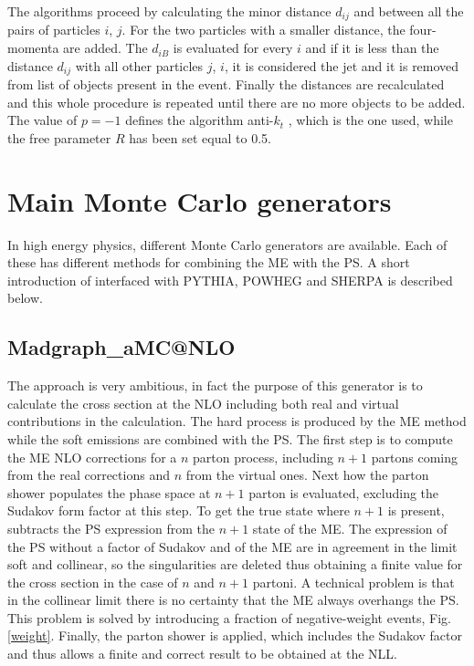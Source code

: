 The algorithms proceed by calculating the minor distance $ d_{ij} $ and between all the pairs of particles $ i $, $ j $. For the two particles with a smaller distance, the four-momenta are added. The $ d_{iB} $ is evaluated for every $ i $ and if it is less than the distance $ d_{ij} $ with all other particles $ j $, $ i $,  it is considered the jet and it is removed from list of objects present in the event.
Finally the distances are recalculated and this whole procedure is repeated until there are no more objects to be added.
The value of $ p = -1 $ defines the algorithm anti-$k_t $ \cite{Cacciari: 2008gp}, which is the one used, while the free parameter $ R $ has been set equal to 0.5.




\section{Main Monte Carlo generators }
In high energy physics, different Monte Carlo generators are available. Each of these has different methods for combining the ME with the PS.
A short introduction of  \aMC interfaced with P{\footnotesize YTHIA}, P{\footnotesize OWHEG}  and S{\footnotesize HERPA} is described below. 
 
 
\subsection*{Madgraph\_aM{\footnotesize C@NLO}}
The \aMC \cite{bib:madgraph} approach is very ambitious, in fact the purpose of this generator is to calculate the cross section at the NLO including both real and virtual contributions in the calculation. The  hard process is produced by the ME method while the soft emissions are combined with the PS.
The first step is to compute the ME NLO corrections for a $ n $ parton process, including $ n + 1 $ partons coming from the real corrections and $ n $ from the virtual ones. Next  how the parton shower populates the phase space at $ n + 1 $ parton is evaluated, excluding the Sudakov form factor at this step. To get the  true  state where $ n + 1 $ is present, \aMC subtracts the PS expression from the $ n + 1 $ state of the ME. The expression of the PS without a factor of Sudakov and of the ME are in agreement in the limit soft and collinear, so the singularities are deleted thus obtaining a finite value for the cross section in the case of $ n $ and $ n + 1 $ partoni. A technical problem is that in the collinear limit there is no certainty that the ME always overhangs the PS. This problem is solved by introducing a fraction of negative-weight events, Fig. \ref{weight}. Finally, the parton shower is applied, which includes the Sudakov factor and thus allows a finite and correct result to be obtained at the NLL. 
 
